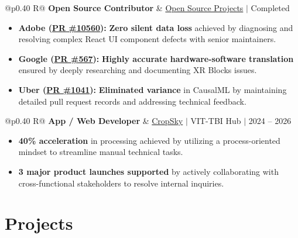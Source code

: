 \documentclass[a4paper,11pt]{article}
\newcommand{\subheading}[1]{\textbf{#1}}
\newcommand{\meta}[1]{{\fontsize{10}{12}\selectfont\textcolor[HTML]{3A3A3A}{#1}}}
\newcommand{\ulink}[2]{\href{#1}{#2}}
\begin{document}
\begin{tabularx}{\linewidth}{@{}p{0.40\linewidth} R@{}}
\subheading{Open Source Contributor} & \meta{\ulink{https://github.com/su-jin1425/My-Open-Source-Contributions}{Open Source Projects} $|$ Completed}
\end{tabularx}
\begin{itemize}[nosep, leftmargin=1.5em, itemsep=2pt, topsep=2pt]
  \item {\color[HTML]{0A0A0A}\fontsize{11}{14}\selectfont \textbf{Adobe (\ulink{https://github.com/adobe/react-spectrum/pull/10560}{PR \#10560}):} \textbf{Zero silent data loss} achieved by diagnosing and resolving complex React UI component defects with senior maintainers.}
  \item {\color[HTML]{0A0A0A}\fontsize{11}{14}\selectfont \textbf{Google (\ulink{https://github.com/google/xrblocks/pull/567}{PR \#567}):} \textbf{Highly accurate hardware-software translation} ensured by deeply researching and documenting XR Blocks issues.}
  \item {\color[HTML]{0A0A0A}\fontsize{11}{14}\selectfont \textbf{Uber (\ulink{https://github.com/uber/causalml/pull/1041}{PR \#1041}):} \textbf{Eliminated variance} in CausalML by maintaining detailed pull request records and addressing technical feedback.}
\end{itemize}

\begin{tabularx}{\linewidth}{@{}p{0.40\linewidth} R@{}}
\subheading{App / Web Developer} & \meta{\ulink{https://sites.google.com/view/cropsky/home}{CropSky} $|$ VIT-TBI Hub $|$ 2024 -- 2026}
\end{tabularx}
\begin{itemize}[nosep, leftmargin=1.5em, itemsep=2pt, topsep=2pt]
  \item {\color[HTML]{0A0A0A}\fontsize{11}{14}\selectfont \textbf{40\% acceleration} in processing achieved by utilizing a process-oriented mindset to streamline manual technical tasks.}
  \item {\color[HTML]{0A0A0A}\fontsize{11}{14}\selectfont \textbf{3 major product launches supported} by actively collaborating with cross-functional stakeholders to resolve internal inquiries.}
\end{itemize}

\section{Projects}
\vspace{2pt}
\end{document}
